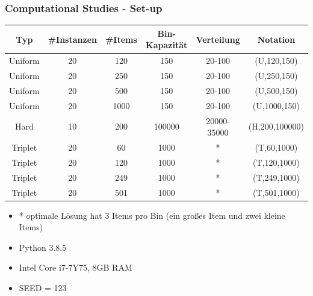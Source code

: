 \documentclass{beamer}
\begin{document}
%
\begin{frame}
\frametitle{Computational Studies - Set-up}

\begin{table}
\begin{footnotesize}
\begin{tabular}{c c c c c c}
\toprule
\textbf{Typ} & \textbf{\#Instanzen} & \textbf{\#Items} & \textbf{Bin-Kapazität} & \textbf{Verteilung} & \textbf{Notation}\\
\midrule
Uniform  & 20   & 120 & 150 & 20-100 & (U,120,150) \\
Uniform  & 20   & 250 & 150 & 20-100 & (U,250,150) \\
Uniform  & 20   & 500 & 150 & 20-100 & (U,500,150) \\
Uniform  & 20   & 1000 & 150 & 20-100 & (U,1000,150) \\\midrule
Hard  & 10   & 200 & 100000 & 20000-35000 & (H,200,100000) \\\midrule
Triplet  & 20   & 60 & 1000 & * & (T,60,1000) \\
Triplet  & 20   & 120 & 1000 & * & (T,120,1000) \\
Triplet  & 20   & 249 & 1000 & * & (T,249,1000) \\
Triplet  & 20   & 501 & 1000 & * & (T,501,1000) \\
\bottomrule
\end{tabular}
\end{footnotesize}
\end{table}
\begin{footnotesize}
\begin{itemize}
\item * optimale Lösung hat 3 Items pro Bin (ein großes Item und zwei kleine Items)
\item Python 3.8.5
\item Intel Core i7-7Y75, 8GB RAM
\item SEED = 123
\end{itemize}
\end{footnotesize}

\end{frame}
\end{document}
